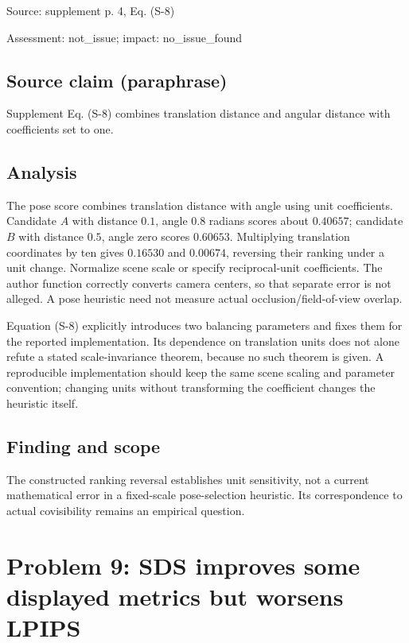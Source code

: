 \documentclass[11pt]{article}
\begin{document}
Source: supplement p. 4, Eq. (S-8)

Assessment: not\_issue; impact: no\_issue\_found

\subsection*{Source claim (paraphrase)}

Supplement Eq. (S-8) combines translation distance and angular distance with coefficients set to one.

\subsection*{Analysis}

The pose score combines translation distance with angle using unit coefficients. Candidate \(A\) with distance \(0.1\), angle \(0.8\) radians scores about \(0.40657\); candidate \(B\) with distance \(0.5\), angle zero scores \(0.60653\). Multiplying translation coordinates by ten gives \(0.16530\) and \(0.00674\), reversing their ranking under a unit change. Normalize scene scale or specify reciprocal-unit coefficients. The author function correctly converts camera centers, so that separate error is not alleged. A pose heuristic need not measure actual occlusion/field-of-view overlap.

Equation (S-8) explicitly introduces two balancing parameters and fixes them for the reported implementation. Its dependence on translation units does not alone refute a stated scale-invariance theorem, because no such theorem is given. A reproducible implementation should keep the same scene scaling and parameter convention; changing units without transforming the coefficient changes the heuristic itself.

\subsection*{Finding and scope}

The constructed ranking reversal establishes unit sensitivity, not a current mathematical error in a fixed-scale pose-selection heuristic. Its correspondence to actual covisibility remains an empirical question.

\section*{Problem 9: SDS improves some displayed metrics but worsens LPIPS}
\end{document}
